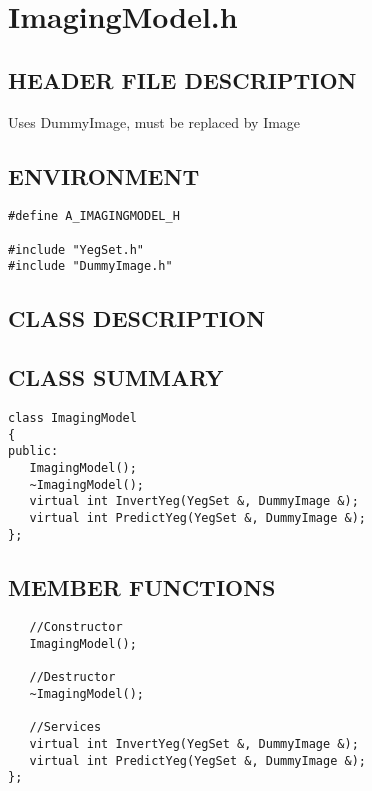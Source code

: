 \clearpage
\section{ImagingModel.h}

\subsection*{HEADER FILE DESCRIPTION}
 Uses DummyImage, must be replaced by Image
  
\subsection*{ENVIRONMENT}
\begin{verbatim}
#define A_IMAGINGMODEL_H

#include "YegSet.h"
#include "DummyImage.h"
\end{verbatim}

\subsection*{CLASS DESCRIPTION}

\subsection*{CLASS SUMMARY}
\begin{verbatim}
class ImagingModel
{
public:
   ImagingModel();
   ~ImagingModel();
   virtual int InvertYeg(YegSet &, DummyImage &);
   virtual int PredictYeg(YegSet &, DummyImage &);
};
\end{verbatim}

\subsection*{MEMBER FUNCTIONS}
\begin{verbatim}
   //Constructor
   ImagingModel();

   //Destructor
   ~ImagingModel();

   //Services
   virtual int InvertYeg(YegSet &, DummyImage &);
   virtual int PredictYeg(YegSet &, DummyImage &);
};
\end{verbatim}
